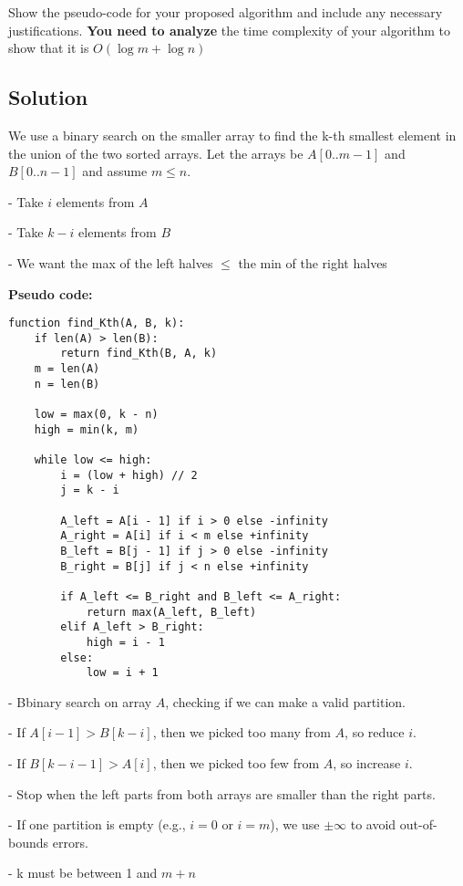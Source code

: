 \documentclass[12pt]{article}
\begin{document}
Show the pseudo-code for your proposed algorithm and include any necessary justifications. \textbf{You need to analyze} the time complexity of your algorithm to show that it is $O(\log m + \log n)$

\subsection*{Solution}

We use a binary search on the smaller array to find the k-th smallest element in the union of the two sorted arrays. Let the arrays be \(A[0..m-1]\) and \(B[0..n-1]\) and assume \(m \leq n\).

- Take \(i\) elements from \(A\)

- Take \(k - i\) elements from \(B\)

- We want the max of the left halves \(\leq\) the min of the right halves

\textbf{Pseudo code:}
\begin{verbatim}
function find_Kth(A, B, k):
    if len(A) > len(B):
        return find_Kth(B, A, k)
    m = len(A)
    n = len(B)

    low = max(0, k - n)
    high = min(k, m)

    while low <= high:
        i = (low + high) // 2
        j = k - i

        A_left = A[i - 1] if i > 0 else -infinity
        A_right = A[i] if i < m else +infinity
        B_left = B[j - 1] if j > 0 else -infinity
        B_right = B[j] if j < n else +infinity

        if A_left <= B_right and B_left <= A_right:
            return max(A_left, B_left)
        elif A_left > B_right:
            high = i - 1
        else:
            low = i + 1
\end{verbatim}

- Bbinary search on array \(A\), checking if we can make a valid partition.

- If \(A[i-1] > B[k-i]\), then we picked too many from \(A\), so reduce \(i\).

- If \(B[k-i-1] > A[i]\), then we picked too few from \(A\), so increase \(i\).

- Stop when the left parts from both arrays are smaller than the right parts.

- If one partition is empty (e.g., \(i = 0\) or \(i = m\)), we use \(\pm\infty\) to avoid out-of-bounds errors.

- k must be between 1 and \(m + n\)
\end{document}
